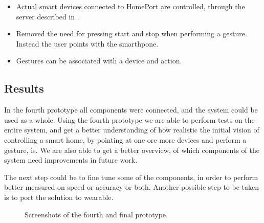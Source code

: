 \begin{itemize}
\item Actual smart devices connected to HomePort are controlled, through the server described in .
\item Removed the need for pressing start and stop when performing a gesture. Instead the user points with the smarthpone.
\item Gestures can be associated with a device and action.
\end{itemize}

\subsection{Results}

In the fourth prototype all components were connected, 
and the system could be used as a whole. 
Using the fourth prototype we are able to perform tests on the entire system, 
and get a better understanding of how realistic the initial vision of controlling a smart home, 
by pointing at one ore more devices and perform a gesture, is. 
We are also able to get a better overview, 
of which components of the system need improvements in future work.

The next step could be to fine tune some of the components, 
in order to perform better measured on speed or accuracy or both. 
Another possible step to be taken is to port the solution to wearable.

\begin{figure}[!htb]%
    \centering
    \caption{Screenshots of the fourth and final prototype.}
    \label{fig:prototype4-app-screenshots}
\end{figure}

